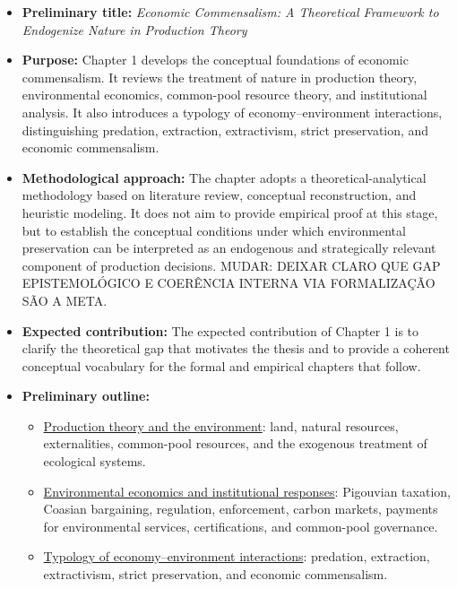 \begin{itemize}

    \item \textbf{Preliminary title:} \emph{Economic Commensalism: A Theoretical Framework to Endogenize Nature in Production Theory}

    \item \textbf{Purpose:} Chapter 1 develops the conceptual foundations of economic commensalism. It reviews the treatment of nature in production theory, environmental economics, common-pool resource theory, and institutional analysis. It also introduces a typology of economy--environment interactions, distinguishing predation, extraction, extractivism, strict preservation, and economic commensalism.

    \item \textbf{Methodological approach:} The chapter adopts a theoretical-analytical methodology based on literature review, conceptual reconstruction, and heuristic modeling. It does not aim to provide empirical proof at this stage, but to establish the conceptual conditions under which environmental preservation can be interpreted as an endogenous and strategically relevant component of production decisions. MUDAR: DEIXAR CLARO QUE GAP EPISTEMOLÓGICO E COERÊNCIA INTERNA VIA FORMALIZAÇÃO SÃO A META.

    \item \textbf{Expected contribution:} The expected contribution of Chapter 1 is to clarify the theoretical gap that motivates the thesis and to provide a coherent conceptual vocabulary for the formal and empirical chapters that follow.

    \item \textbf{Preliminary outline:}

    \begin{itemize}

        \item[i.] \underline{Production theory and the environment}: land, natural resources, externalities, common-pool resources, and the exogenous treatment of ecological systems.

        \item[ii.] \underline{Environmental economics and institutional responses}: Pigouvian taxation, Coasian bargaining, regulation, enforcement, carbon markets, payments for environmental services, certifications, and common-pool governance.

        \item[iii.] \underline{Typology of economy--environment interactions}: predation, extraction, extractivism, strict preservation, and economic commensalism.


\end{itemize}
\end{itemize}
